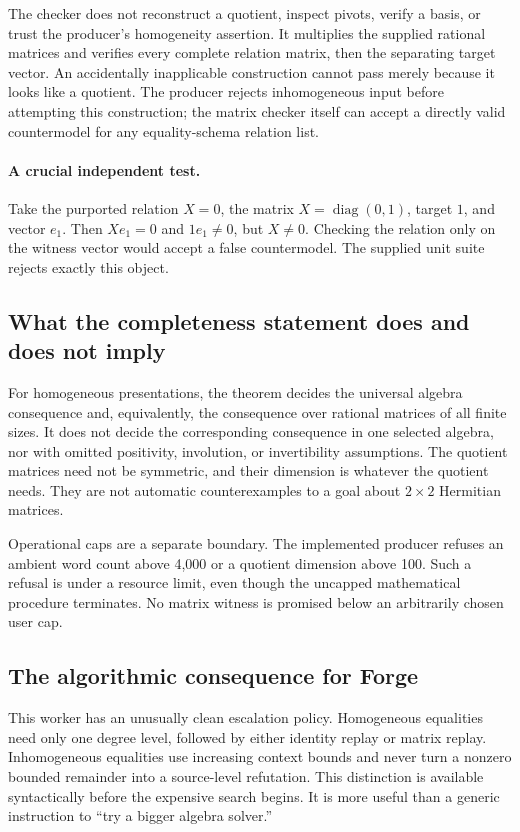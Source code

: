 The checker does not reconstruct a quotient, inspect pivots, verify a basis, or
trust the producer's homogeneity assertion. It multiplies the supplied rational
matrices and verifies every complete relation matrix, then the separating target
vector. An accidentally inapplicable construction cannot pass merely because it
looks like a quotient. The producer rejects inhomogeneous input before attempting
this construction; the matrix checker itself can accept a directly valid
countermodel for any equality-schema relation list.

\paragraph{A crucial independent test.}
Take the purported relation $X=0$, the matrix $X=\operatorname{diag}(0,1)$,
target $1$, and vector $e_1$. Then $Xe_1=0$ and $1e_1\ne0$, but $X\ne0$.
Checking the relation only on the witness vector would accept a false
countermodel. The supplied unit suite rejects exactly this object.

\subsection{What the completeness statement does and does not imply}

For homogeneous presentations, the theorem decides the universal algebra
consequence and, equivalently, the consequence over rational matrices of all
finite sizes. It does not decide the corresponding consequence in one selected
algebra, nor with omitted positivity, involution, or invertibility assumptions.
The quotient matrices need not be symmetric, and their dimension is whatever
the quotient needs. They are not automatic counterexamples to a goal about
$2\times2$ Hermitian matrices.

Operational caps are a separate boundary. The implemented producer refuses an
ambient word count above 4,000 or a quotient dimension above 100. Such a refusal
is \unknown{} under a resource limit, even though the uncapped mathematical
procedure terminates. No matrix witness is promised below an arbitrarily chosen
user cap.

\subsection{The algorithmic consequence for Forge}

This worker has an unusually clean escalation policy. Homogeneous equalities
need only one degree level, followed by either identity replay or matrix replay.
Inhomogeneous equalities use increasing context bounds and never turn a
nonzero bounded remainder into a source-level refutation. This distinction is
available syntactically before the expensive search begins. It is more useful
than a generic instruction to ``try a bigger algebra solver.''

